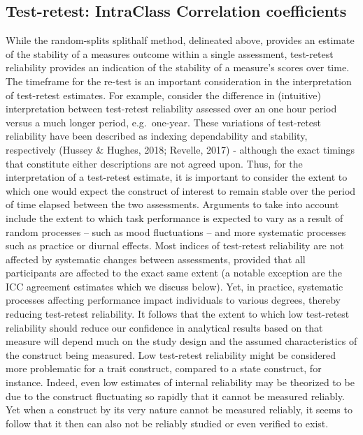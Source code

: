 \documentclass[english,,man,floatsintext]{apa6}
\begin{document}
\hypertarget{test-retest-intraclass-correlation-coefficients}{%
\subsection{Test-retest: IntraClass Correlation coefficients}\label{test-retest-intraclass-correlation-coefficients}}

While the random-splits splithalf method, delineated above, provides an estimate of the stability of a measures outcome within a single assessment, test-retest reliability provides an indication of the stability of a measure's scores over time. The timeframe for the re-test is an important consideration in the interpretation of test-retest estimates. For example, consider the difference in (intuitive) interpretation between test-retest reliability assessed over an one hour period versus a much longer period, e.g.~one-year. These variations of test-retest reliability have been described as indexing dependability and stability, respectively (Hussey \& Hughes, 2018; Revelle, 2017) - although the exact timings that constitute either descriptions are not agreed upon. Thus, for the interpretation of a test-retest estimate, it is important to consider the extent to which one would expect the construct of interest to remain stable over the period of time elapsed between the two assessments. Arguments to take into account include the extent to which task performance is expected to vary as a result of random processes -- such as mood fluctuations -- and more systematic processes such as practice or diurnal effects. Most indices of test-retest reliability are not affected by systematic changes between assessments, provided that all participants are affected to the exact same extent (a notable exception are the ICC agreement estimates which we discuss below). Yet, in practice, systematic processes affecting performance impact individuals to various degrees, thereby reducing test-retest reliability. It follows that the extent to which low test-retest reliability should reduce our confidence in analytical results based on that measure will depend much on the study design and the assumed characteristics of the construct being measured. Low test-retest reliability might be considered more problematic for a trait construct, compared to a state construct, for instance. Indeed, even low estimates of internal reliability may be theorized to be due to the construct fluctuating so rapidly that it cannot be measured reliably. Yet when a construct by its very nature cannot be measured reliably, it seems to follow that it then can also not be reliably studied or even verified to exist.
\end{document}
